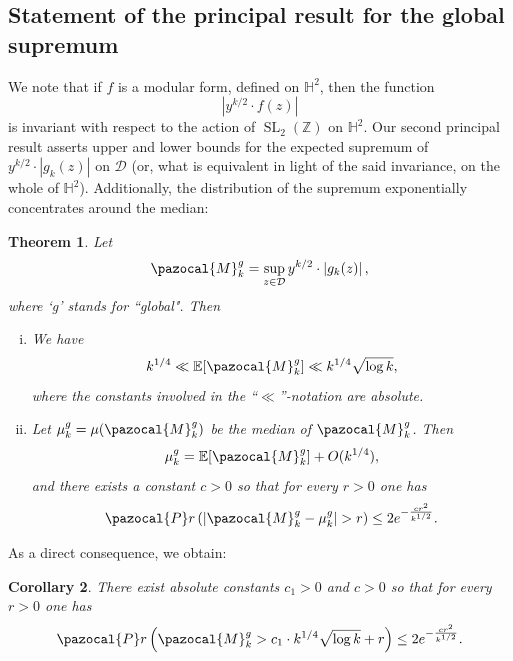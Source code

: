 \documentclass[12pt, a4paper]{amsart}
\newcommand{\tmop}[1]{\ensuremath{\operatorname{#1}}}
\newtheorem{theorem}{Theorem}[section]
\newtheorem{corollary}[theorem]{Corollary}
\theoremstyle{definition}
\newcommand {\E} {\mathbb{E}}
\newcommand {\1} {\mathbf{1}}
\newcommand {\M} {\pazocal {M}}
\newcommand{\prob}{\pazocal{P}r}
\newcommand {\Hb} {\mathbb {H}}
\newcommand {\Dc} {\mathcal{D}}
\numberwithin{equation}{section}
\begin{document}
\subsection{Statement of the principal result for the global supremum}

We note that if $f$ is a modular form, defined on $\Hb^{2}$, then the function $$|y^{k/2}\cdot f(z)|$$ is invariant with respect to the action of $\tmop{SL}_2(\mathbb Z)$ on $\Hb^{2}$.
Our second principal result asserts upper
and lower bounds for the expected supremum of $y^{k/2}\cdot \left|g_{k}(z)\right|$ on $\Dc$ (or, what is equivalent in light of the said invariance, on the whole of $\Hb^{2}$).
Additionally, the distribution of the supremum exponentially concentrates around the median:


\begin{theorem}
\label{thm:sup bnd glob}
Let
\begin{equation*}
\M^{g}_{k}=\sup\limits_{z\in\Dc}y^{k/2}\cdot \left|g_{k}(z)\right|,
\end{equation*}
where `g' stands for ``global".
Then
\begin{enumerate}[i.]

\item We have
\begin{equation}
\label{eq:glob exp sup <<>>k^1/4}
k^{1/4} \ll \E[\M^{g}_{k}]\ll k^{1/4} \sqrt{\log{k}},
\end{equation}
where the constants involved in the ``$\ll$''-notation are absolute.

\item Let $\mu^{g}_{k}=\mu(\M^{g}_{k})$ be the median of $\M^{g}_{k}$. Then
\begin{equation}
\label{eq:mean_median_diff_glob}
\mu^{g}_{k} = \E[\M^{g}_{k}] + O(k^{1/4}),
\end{equation}
and there exists a constant $c>0$ so that for every $r>0$ one has
\begin{equation}
\label{eq:exp conc glob}
\prob\left( \left|\M^{g}_{k}-\mu^{g}_{k}\right|>r \right) \le 2e^{-\frac{cr^{2}}{k^{1/2}}}.
\end{equation}


\end{enumerate}


\end{theorem}

As a direct consequence, we obtain:

\begin{corollary}
\label{cor:exp decay prob glob}
There exist absolute constants $c_{1}>0$ and $c>0$ so that for every $r>0$ one has
\begin{equation*}
\prob\left( \M^{g}_{k}> c_{1}\cdot k^{1/4}\sqrt{\log{k}}+r \right) \le 2e^{-\frac{cr^{2}}{k^{1/2}}}.
\end{equation*}

\end{corollary}
\end{document}
